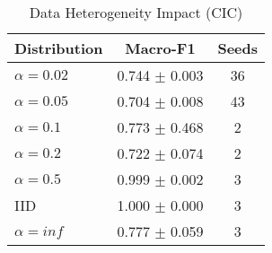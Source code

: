 \begin{table}[htbp]
\centering
\caption{Data Heterogeneity Impact (CIC)}\label{tab:hetero_cic}
\begin{tabular}{lcc}
\toprule
Distribution & Macro-F1 & Seeds \\
\midrule
$\alpha=0.02$ & 0.744 $\pm$ 0.003 & 36 \\
$\alpha=0.05$ & 0.704 $\pm$ 0.008 & 43 \\
$\alpha=0.1$ & 0.773 $\pm$ 0.468 & 2 \\
$\alpha=0.2$ & 0.722 $\pm$ 0.074 & 2 \\
$\alpha=0.5$ & 0.999 $\pm$ 0.002 & 3 \\
IID & 1.000 $\pm$ 0.000 & 3 \\
$\alpha=inf$ & 0.777 $\pm$ 0.059 & 3 \\
\bottomrule
\end{tabular}
\end{table}

